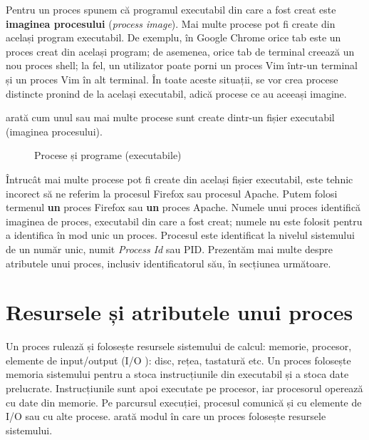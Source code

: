 Pentru un proces spunem că programul executabil din care a fost creat este
\textbf{imaginea procesului} (\textit{process image}). Mai multe procese pot fi create din
același program executabil. De exemplu, în Google Chrome orice tab este un
proces creat din același program; de asemenea, orice tab de terminal creează un nou proces
shell; la fel, un utilizator poate porni un proces Vim într-un terminal și un proces Vim
în alt terminal. În toate aceste situații, se vor crea procese distincte pronind
de la același executabil, adică procese ce au aceeași imagine.

 arată cum unul sau mai multe procese sunt create dintr-un
fișier executabil (imaginea procesului).

\begin{figure}[!htbp]
	\centering
	\def\svgwidth{0.7\textwidth}
	
	\caption{Procese și programe (executabile)}
	\label{fig:process:exec}
\end{figure}

Întrucât mai multe procese pot fi create din același fișier executabil, este
tehnic incorect să ne referim la procesul Firefox sau procesul Apache. Putem
folosi termenul \textbf{un} proces Firefox sau \textbf{un} proces Apache. Numele
unui proces identifică imaginea de proces, executabil din care a fost creat;
numele nu este folosit pentru a identifica în mod unic un proces. Procesul este
identificat la nivelul sistemului de un număr unic, numit \textit{Process Id} sau PID. Prezentăm mai multe despre atributele unui proces,
inclusiv identificatorul său, în secțiunea următoare.

\section{Resursele și atributele unui proces}
\label{sec:process:resources}

Un proces rulează și folosește resursele sistemului de calcul: memorie,
procesor, elemente de input/output (I/O ): disc,
rețea, tastatură etc. Un proces folosește memoria sistemului pentru a stoca
instrucțiunile din executabil și a stoca date prelucrate. Instrucțiunile sunt
apoi executate pe procesor, iar procesorul operează cu date din memorie. Pe
parcursul execuției, procesul comunică și cu elemente de I/O sau cu alte procese.
 arată modul în care un proces folosește resursele
sistemului.

